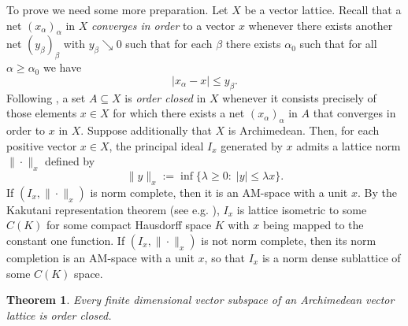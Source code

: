 \documentclass[12pt,reqno]{amsart}
\theoremstyle{plain}
\newtheorem{theorem}{Theorem}[section]
\theoremstyle{definition}
\begin{document}
To prove  we need some more preparation. Let $X$ be a vector lattice. Recall that a net $(x_\alpha)_\alpha$ in $X$ \emph{converges in order} to a vector $x$ whenever there exists another net $(y_\beta)_\beta$ with $y_\beta\searrow 0$ such that for each $\beta$ there exists $\alpha_0$ such that for all $\alpha\geq \alpha_0$ we have 
$$|x_\alpha-x| \leq y_\beta.$$
Following \cite{GL18}, a set $A\subseteq X$ is \emph{order closed} in $X$ whenever it consists precisely of those elements $x\in X$ for which there exists a net $(x_\alpha)_\alpha$ in $A$ that converges in order to $x$ in $X$. Suppose additionally that $X$ is Archimedean. Then, for each positive vector $x\in X$, the principal ideal $I_x$ generated by $x$ admits a lattice norm $\|\cdot\|_x$ defined by
$$\|y\|_x:=\inf\{\lambda\geq 0:\; |y|\leq \lambda x\}.$$ If $(I_x, \|\cdot\|_x)$ is norm complete, then it is an AM-space with a unit $x$.  By the Kakutani representation theorem (see e.g. \cite[Theorem 4.29]{Aliprantis:06}), $I_x$ is lattice isometric to some $C(K)$ for some compact Hausdorff space $K$ with $x$ being mapped to the constant one function. If $(I_x,\|\cdot\|_x)$ is not norm complete, then its norm completion is an AM-space with a unit $x$, so that $I_x$ is a norm dense sublattice of some $C(K)$ space.  

\begin{theorem}\label{n-dimensional order closed}
Every finite dimensional vector subspace of an Archimedean vector lattice is order closed.
\end{theorem}
\end{document}
